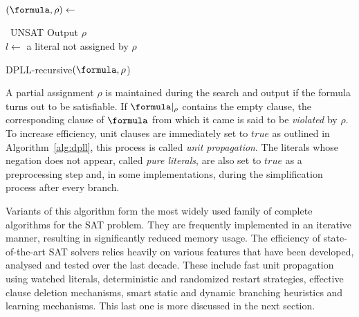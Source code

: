 \begin{algorithm}[htp]
    \SetAlgoLined\DontPrintSemicolon
    $(\formula, \rho) \leftarrow$ \proc{$\formula,\rho$}

    {\Return~UNSAT}
    {Output $\rho$\\
    }
    $l \leftarrow$ a literal not assigned by $\rho$

    {}

    \vspace{2mm}
    \setcounter{AlgoLine}{0}
    \caption{DPLL-recursive$(\formula, \rho$)}
    \label{alg:dpll}
\end{algorithm} 

A partial assignment $\rho$ is maintained during the search and output if the
formula turns out to be satisfiable. If $\formula |_\rho$ contains the empty
clause, the corresponding clause of $\formula$ from which it came is said to be
\emph{violated} by $\rho$. To increase efficiency, unit clauses are immediately
set to $true$ as outlined in Algorithm~\ref{alg:dpll}, this process is called
\emph{unit propagation}. The literals whose negation does not appear, called
\emph{pure literals}, are also set to $true$ as a preprocessing step and, in
some implementations, during the simplification process after every branch.

Variants of this algorithm form the most widely used family of complete
algorithms for the SAT problem. They are frequently implemented in an iterative
manner, resulting in significantly reduced memory usage. The efficiency of
state-of-the-art SAT solvers relies heavily on various features that have been
developed, analysed and tested over the last decade. These include fast unit
propagation using watched literals, deterministic and randomized restart
strategies, effective clause deletion mechanisms, smart static and dynamic
branching heuristics and learning mechanisms. This last one is more discussed in
the next section.

